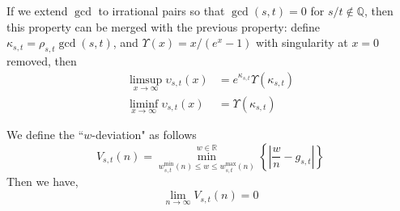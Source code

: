 \documentclass[]{article}
\begin{document}
If we extend $\gcd$ to irrational pairs so that $\gcd(s, t) = 0$ for $s/t\notin \mathbb{Q}$, then this property can be merged with the previous property: define $\kappa_{s,t} = \rho_{s,t} \gcd(s, t)$, and $\Upsilon(x) = x/(e^x-1)$ with singularity at $x=0$ removed, then
\begin{align*}
	\limsup_{x\to\infty} \upsilon_{s,t}(x) &= e^{\kappa_{s,t}}\Upsilon(\kappa_{s,t}) \\
	\liminf_{x\to\infty} \upsilon_{s,t}(x) &= \Upsilon(\kappa_{s,t})
\end{align*}

\vspace{1cm}
\begin{lemma}[$w$ limit]
	We define the ``$w$-deviation" as follows
	\[
		V_{s,t}(n) = \min_{w_{s,t}^{\min}(n)\le w \le w_{s,t}^{\max}(n)}^{w\in\mathbb{R}} \left\{ \left|\frac{w}{n} - g_{s,t}\right| \right\}
	\]
	Then we have, 
	\[
	\lim_{n\to\infty} V_{s,t}(n) = 0
	\]
\end{lemma}
\end{document}
